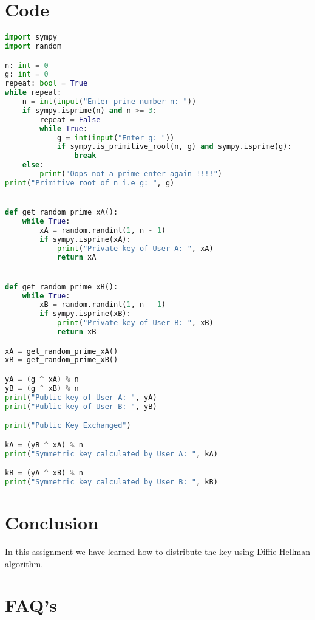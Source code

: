 \documentclass{article}
\begin{document}
\section{\textbf{Code}}
\begin{lstlisting}[language=Python]
    import sympy
import random

n: int = 0
g: int = 0
repeat: bool = True
while repeat:
    n = int(input("Enter prime number n: "))
    if sympy.isprime(n) and n >= 3:
        repeat = False
        while True:
            g = int(input("Enter g: "))
            if sympy.is_primitive_root(n, g) and sympy.isprime(g):
                break
    else:
        print("Oops not a prime enter again !!!!")
print("Primitive root of n i.e g: ", g)


def get_random_prime_xA():
    while True:
        xA = random.randint(1, n - 1)
        if sympy.isprime(xA):
            print("Private key of User A: ", xA)
            return xA


def get_random_prime_xB():
    while True:
        xB = random.randint(1, n - 1)
        if sympy.isprime(xB):
            print("Private key of User B: ", xB)
            return xB

xA = get_random_prime_xA()
xB = get_random_prime_xB()

yA = (g ^ xA) % n
yB = (g ^ xB) % n
print("Public key of User A: ", yA)
print("Public key of User B: ", yB)

print("Public Key Exchanged")

kA = (yB ^ xA) % n
print("Symmetric key calculated by User A: ", kA)

kB = (yA ^ xB) % n
print("Symmetric key calculated by User B: ", kB)

\end{lstlisting}
\section{\textbf{Conclusion}}
In this assignment we have learned how to distribute the key using Diffie-Hellman algorithm.
\section{\textbf{FAQ's}}
\end{document}
